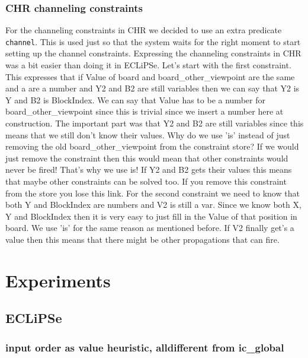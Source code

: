 \documentclass{report}
\begin{document}
\subsubsection{CHR channeling constraints}

For the channeling constraints in CHR we decided to use an extra predicate \texttt{channel}. This is used just so that the system waits for the right moment to start setting up the channel constraints. Expressing the channeling constraints in CHR was a bit easier than doing it in ECLiPSe. Let's start with the first constraint. This expresses that if Value of board and board\_other\_viewpoint are the same and a are a number and Y2 and B2 are still variables then we can say that Y2 is Y and B2 is BlockIndex. We can say that Value has to be a number for board\_other\_viewpoint since this is trivial since we insert a number here at construction. The important part was that Y2 and B2 are still variables since this means that we still don't know their values. Why do we use 'is' instead of just removing the old board\_other\_viewpoint from the constraint store? If we would just remove the constraint then this would mean that other constraints would never be fired! That's why we use is! If Y2 and B2 gets their values this means that maybe other constraints can be solved too. If you remove this constraint from the store you lose this link.
\newline
\newline
For the second constraint we need to know that both Y and BlockIndex are numbers and V2 is still a var. Since we know both X, Y and BlockIndex then it is very easy to just fill in the Value of that position in board. We use 'is' for the same reason as mentioned before. If V2 finally get's a value then this means that there might be other propagations that can fire.
\newpage
\section{Experiments}
\subsection{ECLiPSe}
\subsubsection{input order as value heuristic, alldifferent from ic\_global}
\end{document}
